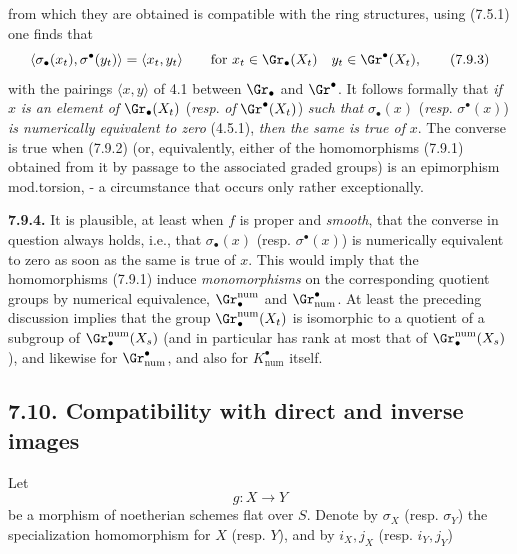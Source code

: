 %

from which they are obtained is compatible with the ring structures, using (7.5.1) one finds that
\[
  \langle\sigma_\bullet(x_t),\sigma^\bullet(y_t)\rangle
  =
  \langle x_t,y_t\rangle
  \qquad\text{for }
  x_t\in\Gr_\bullet(X_t)\quad y_t\in\Gr^\bullet(X_t),
\tag{7.9.3}
\]
with the pairings \(\langle x,y\rangle\) of 4.1 between \(\Gr_\bullet\) and \(\Gr^\bullet\). It follows formally that \emph{if} \(x\) \emph{is an element of} \(\Gr_\bullet(X_t)\) (\emph{resp}. \emph{of} \(\Gr^\bullet(X_t)\)) \emph{such that} \(\sigma_\bullet(x)\) (\emph{resp}. \(\sigma^\bullet(x)\)) \emph{is numerically equivalent to zero} (4.5.1), \emph{then the same is true of} \(x\). The converse is true when (7.9.2) (or, equivalently, either of the homomorphisms (7.9.1) obtained from it by passage to the associated graded groups) is an epimorphism mod.torsion, - a circumstance that occurs only rather exceptionally.

\textbf{7.9.4.} It is plausible, at least when \(f\) is proper and \emph{smooth}, that the converse in question always holds, i.e., that \(\sigma_\bullet(x)\) (resp. \(\sigma^\bullet(x)\)) is numerically equivalent to zero as soon as the same is true of \(x\). This would imply that the homomorphisms (7.9.1) induce \emph{monomorphisms} on the corresponding quotient groups by numerical equivalence, \(\Gr^{\mathrm{num}}_\bullet\) and \(\Gr_{\mathrm{num}}^\bullet\). At least the preceding discussion implies that the group \(\Gr_\bullet^{\mathrm{num}}(X_t)\) is isomorphic to a quotient of a subgroup of \(\Gr_\bullet^{\mathrm{num}}(X_s)\) (and in particular has rank at most that of \(\Gr_\bullet^{\mathrm{num}}(X_s)\)), and likewise for \(\Gr_{\mathrm{num}}^\bullet\), and also for \(K^\bullet_{\mathrm{num}}\) itself.

\subsection*{7.10. Compatibility with direct and inverse images}
Let
\[
  g:X\longrightarrow Y
\]
be a morphism of noetherian schemes flat over \(S\). Denote by \(\sigma_X\) (resp. \(\sigma_Y\)) the specialization homomorphism for \(X\) (resp. \(Y\)), and by \(i_X,j_X\) (resp. \(i_Y,j_Y\))

%

